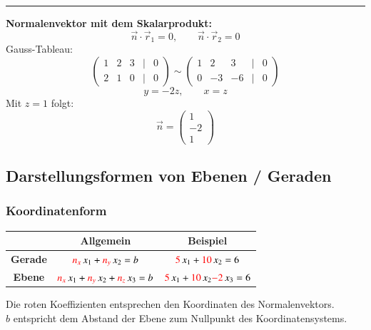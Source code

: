 \vspace{0.2cm}
\hrule
\vspace{0.2cm}

\noindent\textbf{Normalenvektor mit dem Skalarprodukt:}
\[
\vec n\cdot\vec r_1=0,\qquad \vec n\cdot\vec r_2=0
\]
Gauss-Tableau:
\[
\begin{pmatrix}
1&2&3&|&0\\
2&1&0&|&0
\end{pmatrix}
\sim
\begin{pmatrix}
1&2&3&|&0\\
0&-3&-6&|&0
\end{pmatrix}
\]
\[
y=-2z,\qquad x=z
\]
Mit \(z=1\) folgt:
\[
\boxed{\vec n=\begin{pmatrix}1\\-2\\1\end{pmatrix}}
\]


\subsection{Darstellungsformen von Ebenen / Geraden}	
		
\subsubsection{Koordinatenform}	%

\begin{center}
	\renewcommand{\arraystretch}{1.4}
	\begin{tabular}{c|c|c}
							& \textbf{Allgemein}											& \textbf{Beispiel}											\\
		\hline
		\textbf{Gerade} 	& ${\color{red}n_x} \, x_1 + {\color{red}n_y} \, x_2  = b$ 					& ${\color{red}5} \, x_1 + {\color{red}10} \, x_2 = 6 $ 					\\
		\hline
        \textbf{Ebene}	 	& ${\color{red}n_x} \, x_1 + {\color{red}n_y} \, x_2 + {\color{red}n_z} \, x_3 = b$ 	& ${\color{red}5} \, x_1 + {\color{red}10} \, x_2 {\color{red}- 2} \, x_3 = 6 $ 	\\
	\end{tabular}						    
	\renewcommand{\arraystretch}{1}
\end{center}

Die roten Koeffizienten entsprechen den Koordinaten des Normalenvektors. \\
$b$ entspricht dem Abstand der Ebene zum Nullpunkt des Koordinatensystems.
\vspace{0.2cm}
